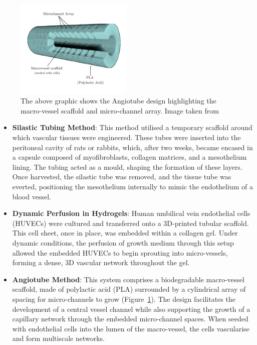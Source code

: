 \documentclass[letterpaper,12pt]{article}
\begin{document}
\begin{figure}[h]
    \centering
    \includegraphics[width=0.5\textwidth]{dapp_report/figures/angiotube_method.png} %
    \caption{The above graphic shows the Angiotube design highlighting the macro-vessel scaffold and micro-channel array. Image taken from \cite{zohar_2022_a} }
    \label{fig:angiotube_fig}
\end{figure}

\begin{itemize}
    \item \textbf{Silastic Tubing Method}: This method utilised a temporary scaffold around which vascular tissues were engineered. These tubes were inserted into the peritoneal cavity of rats or rabbits, which, after two weeks, became encased in a capsule composed of myofibroblasts, collagen matrices, and a mesothelium lining. The tubing acted as a mould, shaping the formation of these layers. Once harvested, the silastic tube was removed, and the tissue tube was everted, positioning the mesothelium internally to mimic the endothelium of a blood vessel\parencite{campbell_1999_novel}. 
    \item \textbf{Dynamic Perfusion in Hydrogels}: Human umbilical vein endothelial cells (HUVECs) were cultured and transferred onto a 3D-printed tubular scaffold. This cell sheet, once in place, was embedded within a collagen gel. Under dynamic conditions, the perfusion of growth medium through this setup allowed the embedded HUVECs to begin sprouting into micro-vessels, forming a dense, 3D vascular network throughout the gel\parencite{elomaa_2022_in}. 
    \item \textbf{Angiotube Method}: This system comprises a biodegradable macro-vessel scaffold, made of polylactic acid (PLA) surrounded by a cylindrical array of spacing for micro-channels to grow (Figure~\ref{fig:angiotube_fig}). The design facilitates the development of a central vessel channel while also supporting the growth of a capillary network through the embedded micro-channel spaces. When seeded with endothelial cells into the lumen of the macro-vessel, the cells vascularise and form multiscale networks\parencite{oconnor_2022_engineering}. 

\end{itemize}
\end{document}
